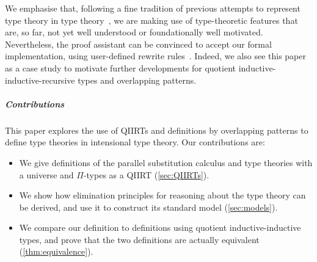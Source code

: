 \documentclass[a4paper,UKenglish,numberwithinsect,cleveref,thm-restate]{lipics-v2021}
\begin{document}

%
We emphasise that, following a fine tradition of previous attempts to represent type theory in type theory~\cite{Danielsson2006,Chapman2009,Altenkirch2016a}, we are making use of type-theoretic features that are, so far, not yet well understood or foundationally well motivated.
Nevertheless, the proof assistant \Agda can be convinced to accept our formal implementation, using user-defined rewrite rules~\cite{Cockx2020,Cockx2021}.
Indeed, we also see this paper as a case study to motivate further developments for quotient inductive-inductive-recursive types and overlapping patterns.

\subparagraph*{Contributions}
This paper explores the use of QIIRTs and definitions by overlapping patterns to define type theories in intensional type theory. Our contributions are:
\begin{itemize}
  \item We give definitions of the parallel substitution calculus and type theories with a universe and $\Pi$-types as a QIIRT (\cref{sec:QIIRTs}).
  \item We show how elimination principles for reasoning about the type theory can be derived, and use it to construct its standard model (\cref{sec:models}).
  \item We compare our definition to definitions using quotient inductive-inductive types, and prove that the two definitions are actually equivalent (\cref{thm:equivalence}).
\end{itemize}
\end{document}
